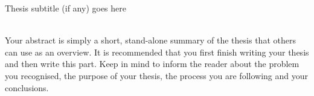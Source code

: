 \begin{center}
    \Large
    
    \vspace{0.4cm}
    \large
    Thesis subtitle (if any) goes here
    
    \vspace{0.4cm}
    
    \vspace{1.5cm}
\\
\vspace{25mm}
Your abstract is simply a short, stand-alone summary of the thesis that others can use as an overview. It is recommended that you first finish writing your thesis and then write this part. Keep in mind to inform the reader about the problem you recognised, the purpose of your thesis, the process you are following and your conclusions.
\end{center}
